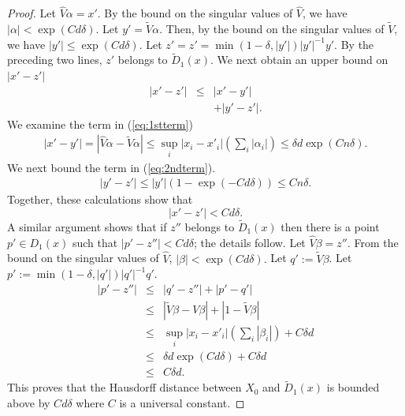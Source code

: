 \documentclass[final, 12pt]{colt2018} %
\begin{document}
\begin{proof}
Let $\hat{V}\alpha = x'$. By the bound on the singular values of $\hat{V}$, we have $|\alpha| < \exp( C{d}\delta).$
Let $y' = \tilde{V}\alpha$. Then, by the bound on the singular values of $\tilde{V}$, we have $|y'| \leq \exp(C{d}\delta)$.
Let $z' = z' = \min(1-\delta,|y'|) |y'|^{-1}y' $. By the preceding two lines,
$  z'$ belongs to $\tilde{D}_1(x).$ We next obtain an upper bound on $|x' -  z'|$
\begin{eqnarray} |x' - z'| & \leq & |x' - y'|\label{eq:1stterm}\\ &  & +|y' - z'|\label{eq:2ndterm}.\end{eqnarray}
We examine the  term in (\ref{eq:1stterm})
\begin{eqnarray*}  |x' -  y'|  =  |\hat{V}\alpha - \tilde{V}\alpha|
                                                               \leq  \sup_i |x_i - x'_i|(\sum_i |\alpha_i|)
                                                               \leq  \delta {d}\exp(Cn\delta).
\end{eqnarray*}
We next bound the term in (\ref{eq:2ndterm}).
\begin{eqnarray*} |y' - z'| \leq  |y'|(1 - \exp(-C{d}\delta))
                                                                            \leq C{n}\delta. 
                                                                            \end{eqnarray*}
                                                                            Together, these calculations show that
$$|x' - z'| < C {d}\delta.$$ 
A similar argument shows that if $ z''$ belongs to $\tilde{D}_1(x)$ then there is a point $p' \in D_1(x)$ such that 
$|p'-z''| < C {d}\delta$; the details follow.
Let $\hat{V}\beta = z''$. From the bound on the singular values of $\hat{V}$, $|\beta|<\exp(C{d}\delta).$
Let $q' :=  \tilde{V}\beta$. Let $p' := \min(1-\delta,|q'|) |q'|^{-1}q'.$
\begin{eqnarray*} |p' - z''| & \leq & |q' - z''| + |p' - q'|\\
                                   & \leq & |\tilde{V}\beta - V\beta| + |1 - \tilde{V}\beta|\\
                                   & \leq &  \sup_i |x_i - x'_i|(\sum_i |\beta_i|) + C\delta d\\
                                   & \leq & \delta{d}\exp(C{d}\delta) + C \delta{d}\\
                                   & \leq &  C \delta{d}.
\end{eqnarray*}
This proves that the Hausdorff distance between $X_0$ and $\tilde{D}_1(x)$ is bounded above by $Cd\delta$ where $C$ is a universal constant.

\end{proof}
\end{document}
